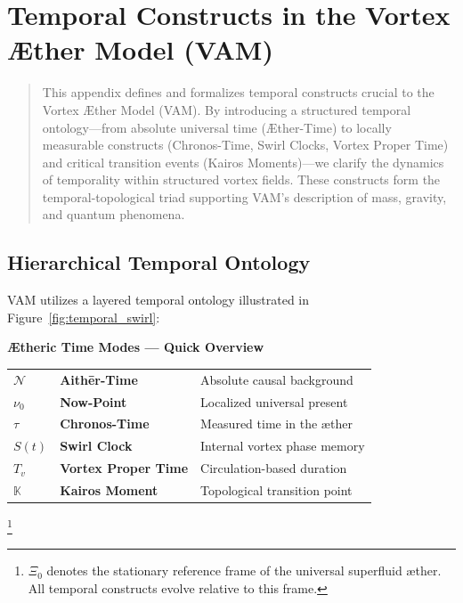 \section{Temporal Constructs in the Vortex Æther Model (VAM)}\label{sec:temporal-constructs-in-the-vortex-ther-model-(vam)}

\begin{abstract}
This appendix defines and formalizes temporal constructs crucial to the Vortex Æther Model (VAM). By introducing a structured temporal ontology—from absolute universal time (Æther-Time) to locally measurable constructs (Chronos-Time, Swirl Clocks, Vortex Proper Time) and critical transition events (Kairos Moments)—we clarify the dynamics of temporality within structured vortex fields. These constructs form the temporal-topological triad supporting VAM's description of mass, gravity, and quantum phenomena.
\end{abstract}

\subsection{Hierarchical Temporal Ontology}

VAM utilizes a layered temporal ontology illustrated in Figure~\ref{fig:temporal_swirl}:
\begin{center}
    \begin{tcolorbox}[colback=gray!10, colframe=black, width=0.9\textwidth, sharp corners=southwest, boxrule=0.5pt]
        \textbf{Ætheric Time Modes — Quick Overview}
        \vspace{0.5em}

        \begin{tabular}{@{}p{1.5cm}p{5.2cm}p{6cm}@{}}
            \(\mathcal{N}\)     & \textbf{Aithēr-Time}         & Absolute causal background \\
            \(\nu_0\)           & \textbf{Now-Point}           & Localized universal present \\
            \(\tau\)            & \textbf{Chronos-Time}        & Measured time in the æther \\
            \(S(t)\)            & \textbf{Swirl Clock}         & Internal vortex phase memory \\
            \(T_v\)             & \textbf{Vortex Proper Time}  & Circulation-based duration \\
            \(\mathbb{K}\)      & \textbf{Kairos Moment}       & Topological transition point \\
        \end{tabular}
    \end{tcolorbox}
\end{center}
\footnote{\(\Xi_0\) denotes the stationary reference frame of the universal superfluid æther. All temporal constructs evolve relative to this frame.}



